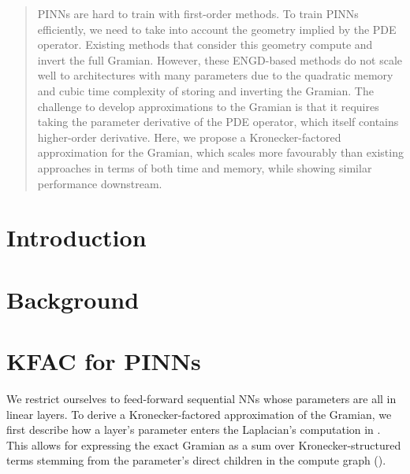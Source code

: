 \documentclass{article}
\begin{document}
\maketitle

\begin{abstract}
  PINNs are hard to train with first-order methods.
  To train PINNs efficiently, we need to take into account the geometry implied by the PDE operator.
  Existing methods that consider this geometry compute and invert the full Gramian.
  However, these ENGD-based methods do not scale well to architectures with many parameters due to the quadratic memory and cubic time complexity of storing and inverting the Gramian.
  The challenge to develop approximations to the Gramian is that it requires taking the parameter derivative of the PDE operator, which itself contains higher-order derivative.
  Here, we propose a Kronecker-factored approximation for the Gramian, which scales more favourably than existing approaches in terms of both time and memory, while showing similar performance downstream.
\end{abstract}


\section{Introduction}



\section{Background}





\section{KFAC for PINNs}

We restrict ourselves to feed-forward sequential NNs whose parameters are all in linear layers.
To derive a Kronecker-factored approximation of the Gramian, we first describe how a layer's parameter enters the Laplacian's computation in .
This allows for expressing the exact Gramian as a sum over Kronecker-structured terms stemming from the parameter's direct children in the compute graph ().
\end{document}
